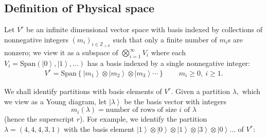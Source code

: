 \documentclass[ALCO, Unicode]{cedram}
\newcommand\bbull[3]{\filldraw[fill=black!35!blue, draw=black] (#1,#2) circle (#3cm);}
\newcommand{\ket}[1]{\left|#1\right\rangle}
\newcommand\sss{\scriptscriptstyle}
\newcommand\ZZ{{\mathbb Z}}
\begin{document}
\subsection{Definition of Physical space}

Let $V^r$ be an infinite dimensional vector space with basis
indexed by collections of nonnegative integers $(m_i)_{i\in \ZZ_{>0}}$ such that only a finite number of $m_i$s are nonzero; we view it as a subspace of $\bigotimes_{i=1}^\infty V_i$ where each $V_i=\text{Span}(\ket{0},\ket{1},\ldots)$ has a basis indexed by a single nonnegative integer:
\begin{align}
    \label{rowPhysicalspacedefi}
    V^{r}=\text{Span}
    \left\{
    \ket{m_1} \otimes \ket{m_2} \otimes \ket{m_3} \cdots
    \right\}
    \qquad
    m_i \geq0,\ i\geq 1. 
    \end{align}
    
We shall identify partitions with basis elements of $V^{r}$. Given
a partition $\lambda,$ which we view as a Young diagram, let $\ket{\lambda}$ be the basis vector with integers 
\[
m_i(\lambda) = \text{number of rows of size $i$ of $\lambda$}
\]
(hence the superscript $r$). For example, we identify the partition $\lambda=(4,4,4,3,1)$ with the basis element $\ket{1}\otimes\ket{0}\otimes \ket{1}\otimes\ket{3}\otimes\ket{0}\ldots$ of $V^{r}$:
\begin{center}
\label{rowphysicalspacepic}
\end{center}
\end{document}
